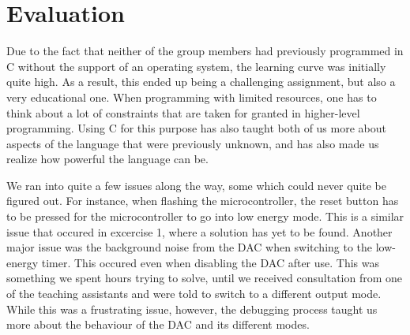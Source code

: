 \section{Evaluation}

Due to the fact that neither of the group members had previously programmed in C without the support of an operating system, the learning curve was initially quite high. As a result, this ended up being a challenging assignment, but also a very educational one. When programming with limited resources, one has to think about a lot of constraints that are taken for granted in higher-level programming. Using C for this purpose has also taught both of us more about aspects of the language that were previously unknown, and has also made us realize how powerful the language can be.
	
	We ran into quite a few issues along the way, some which could never quite be figured out. For instance, when flashing the microcontroller, the reset button has to be pressed for the microcontroller to go into low energy mode. This is a similar issue that occured in excercise 1, where a solution has yet to be found. 
	Another major issue was the background noise from the DAC when switching to the low-energy timer. This occured even when disabling the DAC after use. This was something we spent hours trying to solve, until we received consultation from one of the teaching assistants and were told to switch to a different output mode. While this was a frustrating issue, however, the debugging process taught us more about the behaviour of the DAC and its different modes.